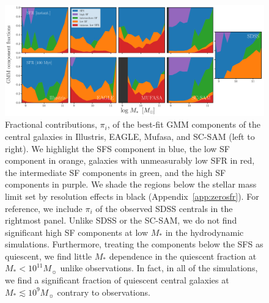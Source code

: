 \documentclass[tighten, preprint]{aastex62}
\begin{document}
\begin{figure}
\begin{center}
\includegraphics[width=\textwidth]{GMMcomp_composition.pdf} 
\caption{Fractional contributions, $\pi_i$, of the best-fit GMM components of 
    the central galaxies in Illustris, EAGLE, {\sc Mufasa}, and SC-SAM (left 
    to right). We highlight the SFS component in blue, the low SF component 
    in orange, galaxies with unmeasurably low SFR in red, the intermediate SF 
    components in green, and the high SF components in purple. We shade the 
    regions below the stellar mass limit set by resolution effects in black 
    (Appendix~\ref{app:zerosfr}). For reference, we include $\pi_i$ of the 
    observed SDSS centrals in the rightmost panel. Unlike SDSS or the SC-SAM, 
    we do not find significant high SF components at low $M_*$ in the hydrodynamic
    simulations. Furthermore, treating the components below the SFS as quiescent,
    we find little $M_*$ dependence in the quiescent fraction at $M_* < 10^{11}M_\sun$
    unlike observations. In fact, in all of the simulations, we find a significant 
    fraction of quiescent central galaxies at $M_* \lesssim 10^9 M_\sun$ contrary to observations.} \label{fig:kandinsky}
\end{center}
\end{figure}
\end{document}
